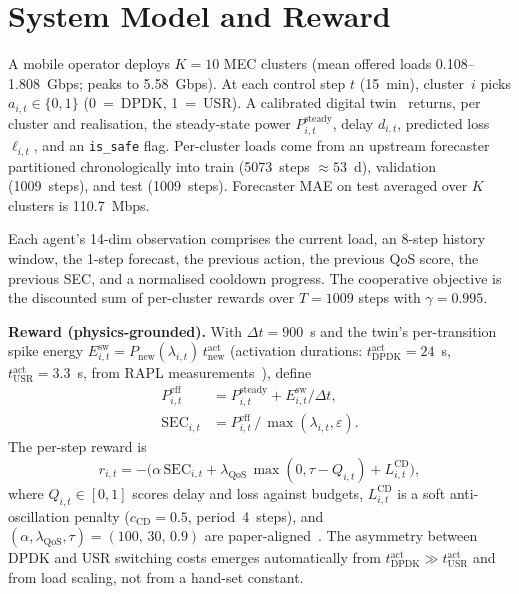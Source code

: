 \documentclass[journal]{IEEEtran}
\providecommand{\SECt}{\mathrm{SEC}}
\begin{document}
\section{System Model and Reward}
\label{sec:model}
A mobile operator deploys $K\!=\!10$ MEC clusters (mean offered
loads 0.108--1.808~Gbps; peaks to 5.58~Gbps). At each control step
$t$ (15~min), cluster~$i$ picks $a_{i,t}\!\in\!\{0,1\}$
(0~=~DPDK, 1~=~USR). A calibrated digital twin~\cite{ref:upfndt}
returns, per cluster and realisation, the steady-state power
$P^{\mathrm{steady}}_{i,t}$, delay $d_{i,t}$, predicted loss
$\ell_{i,t}$, and an \texttt{is\_safe} flag. Per-cluster loads come
from an upstream forecaster~\cite{ref:forecaster} partitioned
chronologically into train (5073~steps $\approx\!53$~d), validation
(1009~steps), and test (1009~steps). Forecaster MAE on test
averaged over $K$ clusters is 110.7~Mbps.

Each agent's 14-dim observation comprises the current load, an
8-step history window, the 1-step forecast, the previous action,
the previous QoS score, the previous SEC, and a normalised
cooldown progress. The cooperative objective is the discounted sum
of per-cluster rewards over $T\!=\!1009$ steps with
$\gamma\!=\!0.995$.

\noindent\textbf{Reward (physics-grounded).}
With $\Delta t = 900$~s and the twin's per-transition spike energy
$E^{\mathrm{sw}}_{i,t} = P_{\mathrm{new}}(\lambda_{i,t})\,
t^{\mathrm{act}}_{\mathrm{new}}$ (activation durations:
$t^{\mathrm{act}}_{\mathrm{DPDK}}\!=\!24$~s,
$t^{\mathrm{act}}_{\mathrm{USR}}\!=\!3.3$~s, from RAPL
measurements~\cite{ref:upfndt}), define
\begin{align}
P^{\mathrm{eff}}_{i,t} &= P^{\mathrm{steady}}_{i,t} + E^{\mathrm{sw}}_{i,t}/\Delta t,\\
\SECt_{i,t}             &= P^{\mathrm{eff}}_{i,t} \,/\, \max(\lambda_{i,t},\varepsilon).
\end{align}
The per-step reward is
\begin{equation}
\label{eq:reward}
r_{i,t} = -\bigl(\alpha\,\SECt_{i,t}
                 + \lambda_{\mathrm{QoS}}\,\max(0,\tau-Q_{i,t})
                 + L^{\mathrm{CD}}_{i,t}\bigr),
\end{equation}
where $Q_{i,t}\!\in\![0,1]$ scores delay and loss against budgets,
$L^{\mathrm{CD}}_{i,t}$ is a soft anti-oscillation penalty
($c_{\mathrm{CD}}\!=\!0.5$, period~4~steps), and
$(\alpha,\lambda_{\mathrm{QoS}},\tau) = (100,\,30,\,0.9)$ are
paper-aligned~\cite{ref:comcom}. The asymmetry between DPDK and USR
switching costs emerges automatically from
$t^{\mathrm{act}}_{\mathrm{DPDK}}\!\gg\!t^{\mathrm{act}}_{\mathrm{USR}}$
and from load scaling, not from a hand-set constant.
\end{document}
